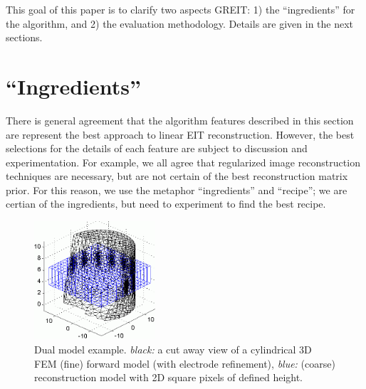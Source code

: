 \documentclass[letterpaper,twocolumn,11pt]{article}
\begin{document}
This goal of this paper is to clarify two aspects GREIT:
1) the ``ingredients'' for the algorithm, and
2) the evaluation methodology. Details are given in the
next sections.

\section{``Ingredients''}

There is general agreement that the algorithm features
described in this section are represent the best approach
to linear EIT reconstruction. However, the best selections
for the details of each feature are subject to discussion
and experimentation. For example, we all agree that
regularized image reconstruction techniques are necessary,
but are not certain of the best reconstruction matrix prior.
For this reason, we use the metaphor ``ingredients'' and
``recipe''; we are certian of the ingredients, but need
to experiment to find the best recipe.
\begin{figure}[tbh]
\begin{center}
 \includegraphics[width= 0.4\textwidth, bb=0 0 427 419]{figs/square_mesh03a.png}
\caption{ \label{fig:dual_model}
Dual model example. {\em black:} a cut away view of a
cylindrical 3D FEM (fine) forward model (with electrode
 refinement),
{\em blue:} (coarse) reconstruction model with 2D square
pixels of defined height.%
\vspace{-0.5cm}
}
\end{center}
\end{figure}
\end{document}
